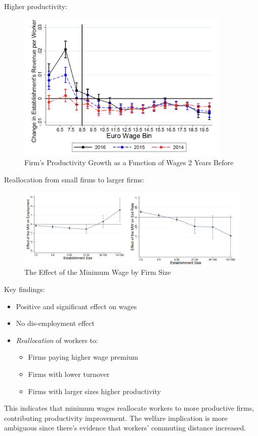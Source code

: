             Higher productivity:
            \begin{figure}[H]
                \centering
                \includegraphics[width=4in]{images/ch2/reallocation_4.png}
                \caption{Firm’s Productivity Growth as a Function of Wages 2 Years Before}
            \end{figure}
            Reallocation from small firms to larger firms:
            \begin{figure}[H]
                \centering
                \includegraphics[width=5.5in]{images/ch2/reallocation_5.png}
                \caption{The Effect of the Minimum Wage by Firm Size}
            \end{figure}
            Key findings:
            \begin{itemize}
                \item Positive and significant effect on wages
                \item No dis-employment effect
                \item \emph{Reallocation} of workers to:
                \begin{itemize}
                    \item Firms paying higher wage premium
                    \item Firms with lower turnover
                    \item Firms with larger sizes higher productivity
                \end{itemize}
            \end{itemize}
            This indicates that minimum wages reallocate workers to more productive firms, contributing productivity improvement. The welfare implication is more ambiguous since there's evidence that workers' commuting distance increased.